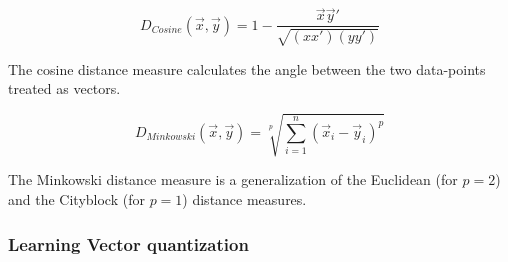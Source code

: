 \begin{equation}
D_{Cosine}(\vec{x},\vec{y})= 1 - \frac{\vec{x}\vec{y}'}{\sqrt{(xx')(yy')}}
\end{equation}

\noindent The cosine distance measure calculates the angle between the two data-points treated as vectors.

\begin{equation}
D_{Minkowski}(\vec{x},\vec{y}) = \sqrt[p]{\sum^n_{i=1}(\vec{x}_i-\vec{y}_i)^p}
\end{equation}

\noindent The Minkowski distance measure is a generalization of the Euclidean (for $p=2$) and the Cityblock (for $p=1$) distance measures.

\subsubsection{Learning Vector quantization}







